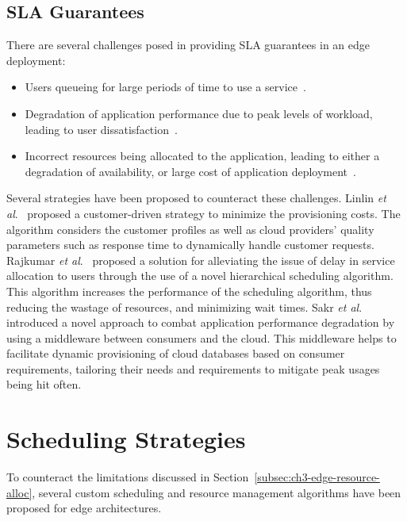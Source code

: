 \subsection{SLA Guarantees}
\label{subsec:ch3-sla-edge}

There are several challenges posed in providing SLA guarantees in an edge deployment:
\begin{itemize}
    \item Users queueing for large periods of time to use a service~\cite{venticinque2011cloud}.
    \item Degradation of application performance due to peak levels of workload, leading to user dissatisfaction~\cite{sakr2012sla}.
    \item Incorrect resources being allocated to the application, leading to either a degradation of availability, or large cost of application deployment~\cite{houlihan2014auditing}.
\end{itemize}

Several strategies have been proposed to counteract these challenges. Linlin \textit{et al}.~\cite{wu2013sla} proposed a customer-driven strategy  to minimize the provisioning costs. The algorithm considers the customer profiles as well as cloud providers' quality parameters such as response time to dynamically handle customer requests. Rajkumar \textit{et al}.~\cite{rajavel2012achieving} proposed a solution for alleviating the issue of delay in service allocation to users through the use of a novel hierarchical scheduling algorithm. This algorithm increases the performance of the scheduling algorithm, thus reducing the wastage of resources, and minimizing wait times. Sakr \textit{et al}.~\cite{sakr2012sla} introduced a novel approach to combat application performance degradation by using a middleware between consumers and the cloud. This middleware helps to facilitate dynamic provisioning of cloud databases based on consumer requirements, tailoring their needs and requirements to mitigate peak usages being hit often.

\section{Scheduling Strategies}
\label{sec:ch3-resource-schedule-solutions}

To counteract the limitations discussed in Section~\ref{subsec:ch3-edge-resource-alloc}, several custom scheduling and resource management algorithms have been proposed for edge architectures.\par

